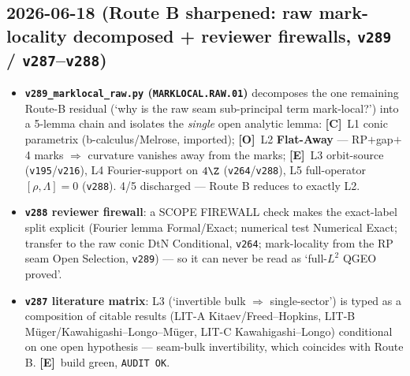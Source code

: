 \documentclass[11pt]{article}
\providecommand{\mE}{\textbf{[E]}}\providecommand{\mC}{\textbf{[C]}}
\providecommand{\mO}{\textbf{[O]}}\providecommand{\mX}{\textbf{[X]}}
\providecommand{\vref}[1]{\texttt{#1}}
\begin{document}
\subsection*{2026-06-18 (Route B sharpened: raw mark-locality decomposed + reviewer firewalls, \texttt{v289} / \texttt{v287}--\texttt{v288})}
\begin{itemize}
\item \textbf{\texttt{v289\_marklocal\_raw.py} (\texttt{MARKLOCAL.RAW.01})} decomposes the one remaining
  Route-B residual (`why is the raw seam sub-principal term mark-local?') into a 5-lemma chain and
  isolates the \emph{single} open analytic lemma: \mC\ L1 conic parametrix (b-calculus/Melrose, imported);
  \mO\ L2 \textbf{Flat-Away} --- RP$+$gap$+$4 marks $\Rightarrow$ curvature vanishes away from the marks;
  \mE\ L3 orbit-source (\vref{v195}/\vref{v216}), L4 Fourier-support on $4\Z$ (\vref{v264}/\vref{v288}),
  L5 full-operator $[\rho,\Lambda]{=}0$ (\vref{v288}). 4/5 discharged --- Route B reduces to exactly L2.
\item \textbf{\texttt{v288} reviewer firewall}: a SCOPE FIREWALL check makes the exact-label split explicit
  (Fourier lemma Formal/Exact; numerical test Numerical Exact; transfer to the raw conic DtN Conditional,
  \vref{v264}; mark-locality from the RP seam Open Selection, \vref{v289}) --- so it can never be read as
  `full-$L^2$ QGEO proved'.
\item \textbf{\texttt{v287} literature matrix}: L3 (`invertible bulk $\Rightarrow$ single-sector') is typed as
  a composition of citable results (LIT-A Kitaev/Freed--Hopkins, LIT-B M\"uger/Kawahigashi--Longo--M\"uger,
  LIT-C Kawahigashi--Longo) conditional on one open hypothesis --- seam-bulk invertibility, which coincides
  with Route B. \mE\ build green, \texttt{AUDIT OK}.
\end{itemize}
\end{document}
